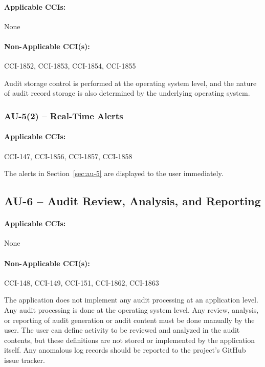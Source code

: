 \documentclass[letterpaper, 10pt, twoside]{article}
\begin{document}
\paragraph{Applicable CCIs:} None

\paragraph{Non-Applicable CCI(s):} CCI-1852, CCI-1853, CCI-1854, CCI-1855

Audit storage control is performed at the operating system level, and the nature of audit record storage is also determined by the underlying operating system.

\subsubsection{AU-5(2) -- Real-Time Alerts}

\paragraph{Applicable CCIs:} CCI-147, CCI-1856, CCI-1857, CCI-1858

The alerts in Section~\ref{sec:au-5} are displayed to the user immediately.

\subsection{AU-6 -- Audit Review, Analysis, and Reporting}

\paragraph{Applicable CCIs:} None

\paragraph{Non-Applicable CCI(s):} CCI-148, CCI-149, CCI-151, CCI-1862, CCI-1863

The application does not implement any audit processing at an application level. Any audit processing is done at the operating system level. Any review, analysis, or reporting of audit generation or audit content must be done manually by the user. The user can define activity to be reviewed and analyzed in the audit contents, but these definitions are not stored or implemented by the application itself. Any anomalous log records should be reported to the project's GitHub issue tracker.
\end{document}
